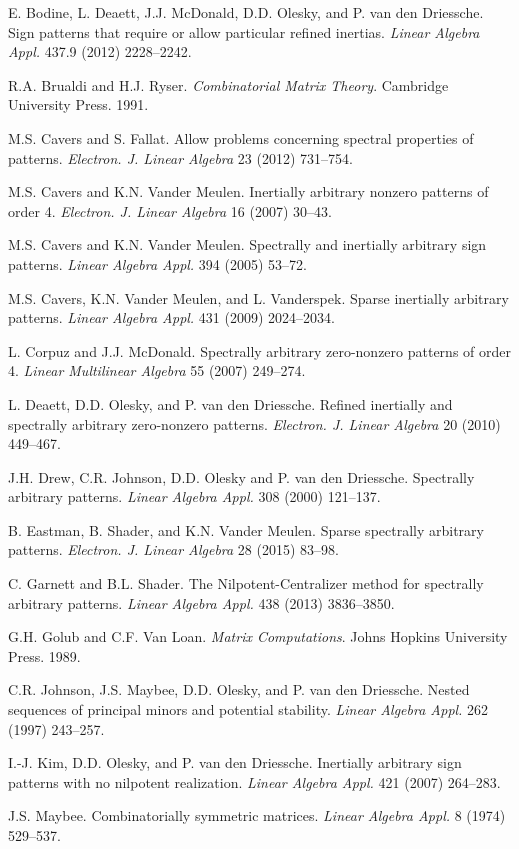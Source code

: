 \documentclass[10pt]{amsart}
\begin{document}
\begin{thebibliography}{99}  

 E. Bodine, L. Deaett, J.J. McDonald, D.D. Olesky, and P. van den Driessche.
Sign patterns that require or allow particular refined inertias.
\emph{Linear Algebra Appl.} 437.9 (2012) 2228--2242.

 R.A. Brualdi and H.J. Ryser. 
\emph{Combinatorial Matrix Theory}. Cambridge University Press. 1991.

 M.S. Cavers and S. Fallat. Allow problems concerning spectral properties of patterns. 
\emph{Electron. J. Linear Algebra} 23 (2012) 731--754.

 M.S. Cavers and K.N. Vander Meulen. Inertially arbitrary nonzero patterns of order 4. \emph{Electron. J. Linear Algebra} 16 (2007) 30--43.

 M.S. Cavers and K.N. Vander Meulen. Spectrally and inertially arbitrary sign patterns. \emph{Linear Algebra Appl.} 394 (2005) 53--72.

 M.S. Cavers, K.N. Vander Meulen, and L. Vanderspek. 
Sparse inertially arbitrary patterns. \emph{Linear Algebra Appl.} 431 (2009) 2024--2034.

 L. Corpuz and J.J. McDonald. Spectrally arbitrary zero-nonzero patterns of order 4. \emph{Linear Multilinear Algebra} 55 (2007) 249--274.

 L. Deaett, D.D. Olesky, and P. van den Driessche. 
Refined inertially and spectrally arbitrary zero-nonzero patterns.
\emph{Electron. J. Linear Algebra} 20 (2010) 449--467.

 J.H. Drew, C.R. Johnson, D.D. Olesky and P. van den Driessche. Spectrally arbitrary patterns.
\emph{Linear Algebra Appl.} 308 (2000) 121--137.

 B. Eastman, B. Shader, and K.N. Vander Meulen. Sparse spectrally arbitrary patterns. 
\emph{Electron. J. Linear Algebra} 28 (2015) 83--98.

 C. Garnett and B.L. Shader. The Nilpotent-Centralizer method for spectrally arbitrary patterns. \emph{Linear Algebra Appl.} 438 (2013) 3836--3850.

 G.H. Golub and C.F. Van Loan. \emph{Matrix Computations}. Johns Hopkins University Press. 
1989.

 C.R. Johnson, J.S. Maybee, D.D. Olesky, and P. van den Driessche. Nested sequences of principal minors and potential stability.
\emph{Linear Algebra Appl.} 262 (1997) 243--257.

 I.-J. Kim, D.D. Olesky, and
P. van den Driessche. Inertially arbitrary sign patterns with no
nilpotent realization. \emph{Linear Algebra Appl.} 421 (2007) 264--283.

 J.S. Maybee. Combinatorially symmetric matrices. 
\emph{Linear Algebra Appl.} 8 (1974) 529--537.

\end{thebibliography}
\end{document}
